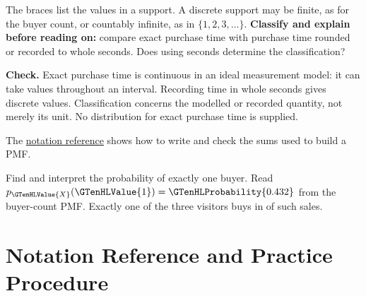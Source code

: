 The braces list the values in a support. A discrete support may be finite, as for the buyer count, or countably infinite, as in $\{1,2,3,\ldots\}$. \textbf{Classify and explain before reading on:} compare exact purchase time with purchase time rounded or recorded to whole seconds. Does using seconds determine the classification?

\par\smallskip\textbf{Check.} Exact purchase time is continuous in an ideal measurement model: it can take values throughout an interval. Recording time in whole seconds gives discrete values. Classification concerns the modelled or recorded quantity, not merely its unit. No distribution for exact purchase time is supplied.

The \hyperref[subsec:t2-c1-notation-reference]{notation reference} shows how to write and check the sums used to build a PMF.

\par\medskip\noindent{} Find and interpret the probability of exactly one buyer. Read $p_{\GTenHLValue{X}}(\GTenHLValue{1})=\GTenHLProbability{0.432}$ from the buyer-count PMF. Exactly one of the three visitors buys in  of such sales.


\section{Notation Reference and Practice Procedure}\label{sec:t2-c1-notation-and-procedure}


